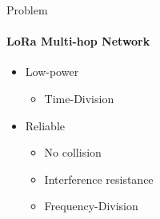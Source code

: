 \begin{frame}{Problem}
\framesubtitle{LoRa Multi-hop Network}
\begin{itemize}
    \item Low-power
    \begin{itemize}
        \item Time-Division
    \end{itemize}
    \item Reliable
    \begin{itemize}
        \item No collision
        \item Interference resistance
        \item Frequency-Division
    \end{itemize}
\end{itemize}
\end{frame}


